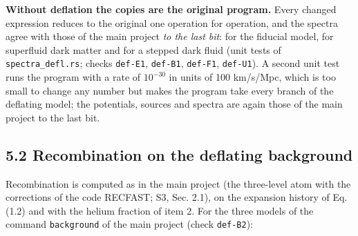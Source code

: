 \documentclass[
  10pt,
]{article}
\begin{document}
\textbf{Without deflation the copies are the original program.} Every
changed expression reduces to the original one operation for operation,
and the spectra agree with those of the main project \emph{to the last
bit}: for the fiducial model, for superfluid dark matter and for a
stepped dark fluid (unit tests of \texttt{spectra\_defl.rs}; checks
\texttt{def-E1}, \texttt{def-B1}, \texttt{def-F1}, \texttt{def-U1}). A
second unit test runs the program with a rate of \(10^{-30}\) in units
of 100 km/s/Mpc, which is too small to change any number but makes the
program take every branch of the deflating model; the potentials,
sources and spectra are again those of the main project to the last bit.

\hypertarget{recombination-on-the-deflating-background}{%
\subsection{5.2 Recombination on the deflating
background}\label{recombination-on-the-deflating-background}}

Recombination is computed as in the main project (the three-level atom
with the corrections of the code RECFAST; S3, Sec. 2.1), on the
expansion history of Eq. (1.2) and with the helium fraction of item 2.
For the three models of the command \texttt{background} of the main
project (check \texttt{def-B2}):
\end{document}
